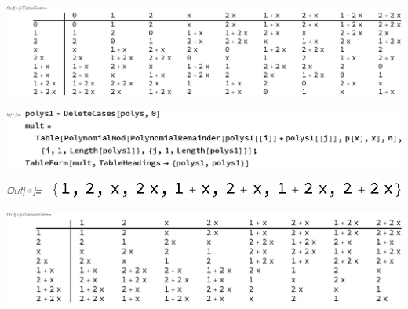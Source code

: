 \documentclass{article}
\begin{document}
\includegraphics{gr9.eps}

\includegraphics{gr10.eps}

\includegraphics{gr11.eps}

\includegraphics{gr12.eps}
\end{document}

